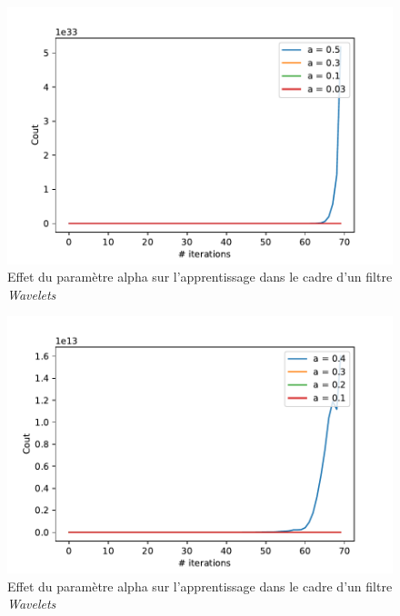 
\begin{figure}[th]
\centering
\includegraphics{Figures/Benchmarking_para_alpha_2}
\decoRule %
\caption[Figure]{Effet du paramètre alpha sur l'apprentissage dans le cadre d'un filtre \textit{Wavelets}}
\label{fig:benchmark_surApp1}
\end{figure}

\begin{figure}[th]
\centering
\includegraphics{Figures/Benchmarking_para_alpha_3}
\decoRule %
\caption[Figure]{Effet du paramètre alpha sur l'apprentissage dans le cadre d'un filtre \textit{Wavelets}}
\label{fig:benchmark_surApp2}
\end{figure}


